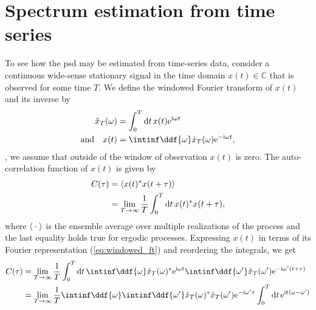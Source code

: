 \section{Spectrum estimation from time series}\label{sec:speck:theory:time_series_estimation}
To see how the \gls{psd} may be estimated from time-series data, consider a continuous wide-sense stationary
signal in the time domain $x(t)\in\mathbb{C}$ that is observed for some time $T$.
We define the windowed Fourier transform of $x(t)$ and its inverse by
\begin{align}
    \hat{x}_T(\omega) &= \int_{0}^{T}\dd{t} x(t)\e^{\i\omega t} \label{eq:windowed_ft}\\
       \qq*{and} x(t) &= \intinf\ddf{\omega}\hat{x}_T(\omega)\e^{-\i\omega t}, \label{eq:windowed_ft:inverse}
\end{align}
\ie, we assume that outside of the window of observation $x(t)$ is zero.
The auto-correlation function of $x(t)$ is given by
\begin{align}
    C(\tau) &= \expval{x(t)^\ast x(t + \tau)} \label{eq:autocorrelation}\\
            &= \lim_{T\to\infty} \frac{1}{T}\int_0^T\dd{t} x(t)^{\ast} x(t + \tau),
\end{align}
where $\expval{\:\cdot\:}$ is the ensemble average over multiple realizations of the process and the last equality holds true for ergodic processes.
Expressing $x(t)$ in terms of its Fourier representation (\cref{eq:windowed_ft}) and reordering the integrals, we get
\begin{align}
    C(\tau) &= \lim_{T\to\infty}\frac{1}{T}\int_0^T\dd{t}
                \intinf\ddf{\omega}\hat{x}_T(\omega)^{\ast}\e^{\i\omega t}
                \intinf\ddf{\omega^\prime}\hat{x}_T(\omega^\prime)\e^{-\i\omega^\prime (t + \tau)}  \\
            &= \lim_{T\to\infty}\frac{1}{T}\intinf\ddf{\omega}\intinf\ddf{\omega^\prime}
                \hat{x}_T(\omega)^{\ast}\hat{x}_T(\omega^\prime)\e^{-\i\omega^\prime\tau}
                \int_0^T\dd{t}\e^{\i t (\omega - \omega^\prime)} \label{eq:autocorrelation:fourier}
\end{align}
